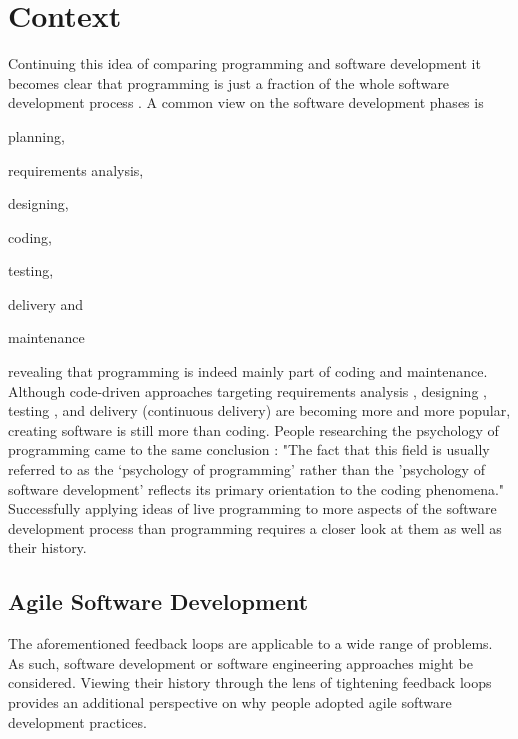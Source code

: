 


\section{Context}
\label{sec:context}
Continuing this idea of comparing programming and software development it becomes clear that programming is just a fraction of the whole software development process \cite{yang_phase_2008}.
A common view on the software development phases is \begin{enumerate*}[label=(\roman*)]
\item planning,
\item requirements analysis,
\item designing,
\item coding,
\item testing,
\item delivery and
\item maintenance
\end{enumerate*}
revealing that programming is indeed mainly part of coding and maintenance.
Although code-driven approaches targeting requirements analysis \addref, designing \addref, testing \addref, and delivery (continuous delivery) are becoming more and more popular, creating software is still more than coding.
People researching the psychology of programming came to the same conclusion \cite{curtis_psychology_1990}: "The fact that this field is usually referred to as the `psychology of programming' rather than the 'psychology of software development' reflects its primary orientation to the coding phenomena."
Successfully applying ideas of live programming to more aspects of the software development process than programming requires a closer look at them as well as their history.


\subsection{Agile Software Development}
\label{sec:agile-movement}
The aforementioned feedback loops are applicable to a wide range of problems.
As such, software development or software engineering approaches might be considered.
Viewing their history through the lens of tightening feedback loops provides an additional perspective on why people adopted agile software development practices.

